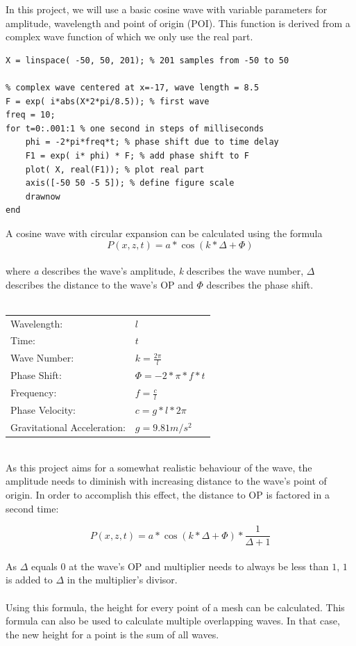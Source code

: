 \documentclass[12pt,a4paper]{scrartcl}
\begin{document}
In this project, we will use a basic cosine wave with variable parameters for amplitude, wavelength and point of origin (POI). This function is derived from a complex wave function of which we only use the real part.
\begin{lstlisting}[language=PSEUDO]
X = linspace( -50, 50, 201); % 201 samples from -50 to 50

% complex wave centered at x=-17, wave length = 8.5
F = exp( i*abs(X*2*pi/8.5)); % first wave
freq = 10;
for t=0:.001:1 % one second in steps of milliseconds
	phi = -2*pi*freq*t; % phase shift due to time delay
	F1 = exp( i* phi) * F; % add phase shift to F
	plot( X, real(F1)); % plot real part
	axis([-50 50 -5 5]); % define figure scale
	drawnow
end
\end{lstlisting}

A cosine wave with circular expansion can be calculated using the formula
$$P(x,z,t) = a * \cos(k * {\Delta} + \Phi) $$
\ \\
where \textit{a} describes the wave's amplitude, \textit{k} describes the wave number, ${\Delta}$ describes the distance to the wave's OP and $\Phi$ describes the phase shift.\\
\ \\
\begin{center}
	\begin{tabular}{ll}
		Wavelength: & $l$ \\
		Time: & $t$ \\
		Wave Number: & $k = \frac{2\pi}{l}$ \\
		Phase Shift: & $\Phi = -2 * \pi * f * t$ \\
		Frequency: & $f = \frac{c}{l}$ \\
		Phase Velocity: & $c = g * l * 2\pi$ \\
		Gravitational Acceleration: & $g = 9.81 m/s^2$
	\end{tabular}
\end{center}
\ \\
As this project aims for a somewhat realistic behaviour of the wave, the amplitude needs to diminish with increasing distance to the wave's point of origin. In order to accomplish this effect, the distance to OP is factored in a second time:

$$P(x,z,t) = a * \cos(k * {\Delta} + \Phi) * \frac{1}{{\Delta}+1} $$
\ \\
As ${\Delta}$ equals $0$ at the wave's OP and multiplier needs to always be less than $1$, $1$ is added to ${\Delta}$ in the multiplier's divisor.\\
\ \\
Using this formula, the height for every point of a mesh can be calculated. This formula can also be used to calculate multiple overlapping waves. In that case, the new height for a point is the sum of all waves.\\
\end{document}

